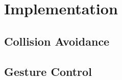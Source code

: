 \section{Implementation}
\label{sec:implementation}

\subsection{Collision Avoidance}
\subsection{Gesture Control}
